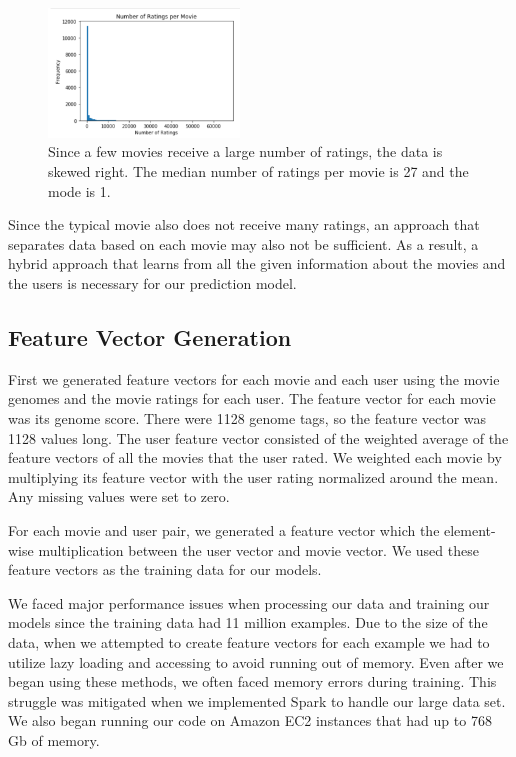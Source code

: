 \documentclass{sig-alternate-05-2015}
\begin{document}
\begin{figure}
    \begin{center}
        \includegraphics[width=2in]{NumRatingsPerMovie.png}
        \caption{Since a few movies receive a large number of ratings, the data is skewed right. The median number of
        ratings per movie is 27 and the mode is 1.}
        \label{ratingspermovie}
    \end{center}
\end{figure}

Since the typical movie also does not receive many ratings, an approach that separates
data based on each movie may also not be sufficient. As a result, a hybrid approach that learns from all the given
information about the movies and the users is necessary for our prediction model.

\subsection{Feature Vector Generation}

First we generated feature vectors for each movie and each user using the movie genomes and the movie ratings for each user. The
feature vector for each movie was its genome score. There were 1128 genome tags, so the feature vector was 1128 values long. The user
feature vector consisted of the weighted average of the feature vectors of all the movies that the user rated. We weighted
each movie by multiplying its feature vector with the user rating normalized around the mean. Any missing values were set to zero.

For each movie and user pair, we generated a feature vector which the element-wise multiplication between the user vector and movie vector.
We used these feature vectors as the training data for our models.

We faced major performance issues when processing our data and training our models since the training data had 11 million examples.
Due to the size of the data, when we attempted to create feature vectors for each example we had to utilize lazy loading and
accessing to avoid running out of memory. Even after we began using these methods, we often faced memory errors during training.
This struggle was mitigated when we implemented Spark to handle our large data set. We also began running our code on Amazon EC2 instances
that had up to 768 Gb of memory.
\end{document}

